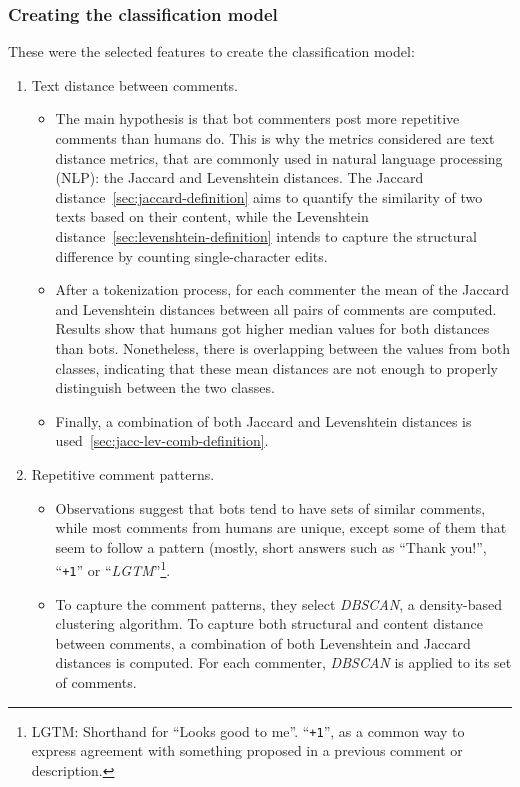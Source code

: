 \documentclass[a4paper, 12pt]{book}
\begin{document}
\subsubsection{Creating the classification model}
\label{sssec:golzadeh-classification}

These were the selected features to create the classification model:

\begin{enumerate}
    \item Text distance between comments.
    \begin{itemize}
        \item The main hypothesis is that bot commenters post more repetitive comments than humans do. This is why the metrics considered are text distance metrics, that are commonly used in natural language processing (NLP): the Jaccard and Levenshtein distances. The Jaccard distance~\ref{sec:jaccard-definition} aims to quantify the similarity of two texts based on their content, while the Levenshtein distance~\ref{sec:levenshtein-definition} intends to capture the structural difference by counting single-character edits.
        \item After a tokenization process, for each commenter the mean of the Jaccard and Levenshtein distances between all pairs of comments
        are computed. Results show that humans got higher median values for both distances than bots. Nonetheless, there is overlapping between the values from both classes, indicating that these mean distances are not enough to properly distinguish between the two classes.
        \item Finally, a combination of both Jaccard and Levenshtein distances is used~\ref{sec:jacc-lev-comb-definition}.
    \end{itemize}
    \item Repetitive comment patterns.
        \begin{itemize}
            \item Observations suggest that bots tend to have sets of similar comments, while most comments from humans are unique, except some of them that seem to follow a pattern (mostly, short answers such as ``Thank you!'', ``\texttt{+1}'' or ``\textit{LGTM}''\footnote{ LGTM: Shorthand for ``Looks good to me''. ``\texttt{+1}'', as a common way to express agreement with something proposed in a previous comment or description.}.
            \item To capture the comment patterns, they select \textit{DBSCAN}, a density-based clustering algorithm. To capture both structural and content distance between comments, a combination of both Levenshtein and Jaccard distances is computed. For each commenter, \textit{DBSCAN} is applied to its set of comments.

\end{itemize}
\end{enumerate}
\end{document}
